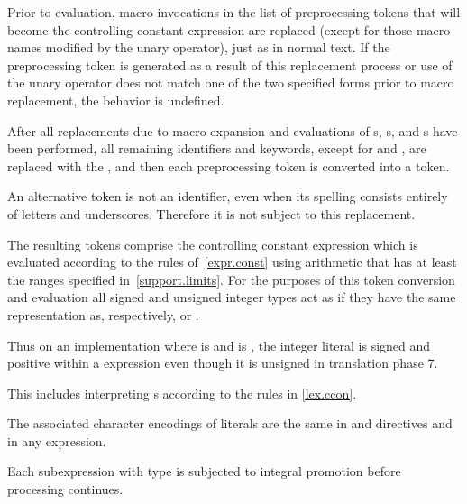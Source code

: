 \pnum
Prior to evaluation,
macro invocations in the list of preprocessing tokens
that will become the controlling constant expression
are replaced
(except for those macro names modified by the
unary operator),
just as in normal text.
If the preprocessing token
is generated as a result of this replacement process
or use of the
unary operator does not match one of the two specified forms
prior to macro replacement,
the behavior is undefined.

\pnum
After all replacements due to macro expansion and
evaluations of
s,
s, and
s
have been performed,
all remaining identifiers and keywords,
except for
and
,
are replaced with the 
,
and then each preprocessing token is converted into a token.
\begin{note}
An alternative
token is not an identifier,
even when its spelling consists entirely of letters and underscores.
Therefore it is not subject to this replacement.
\end{note}

\pnum
The resulting tokens comprise the controlling constant expression
which is evaluated according to the rules of~\ref{expr.const}
using arithmetic that has at least the ranges specified
in~\ref{support.limits}. For the purposes of this token conversion and evaluation
all signed and unsigned integer types
act as if they have the same representation as, respectively,
 or .
\begin{note}
Thus on an
implementation where  is 
and  is ,
the integer literal  is signed and positive within a 
expression even though it is unsigned in translation phase
7.
\end{note}
This includes interpreting s
according to the rules in \ref{lex.ccon}.
\begin{note}
The associated character encodings of literals are the same
in  and  directives and in any expression.
\end{note}
Each subexpression with type
is subjected to integral promotion before processing continues.

